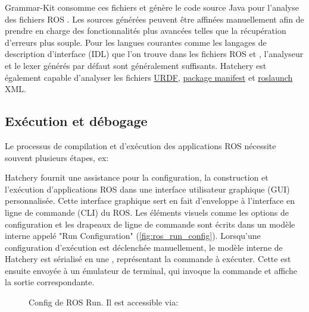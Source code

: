 Grammar-Kit consomme ces fichiers et génère le code source Java pour l'analyse des fichiers ROS \href{https://wiki.ros.org/msg}{}. Les sources générées peuvent être affinées manuellement afin de prendre en charge des fonctionnalités plus avancées telles que la récupération d'erreurs plus souple. Pour les langues courantes comme les langages de description d'interface (IDL) que l'on trouve dans les fichiers ROS \href{https://wiki.ros.org/msg}{} et \href{https://wiki.ros.org/srv}{}, l'analyseur et le lexer générés par défaut sont généralement suffisants. Hatchery est également capable d'analyser les fichiers \href{https://wiki.ros.org/urdf}{URDF}, \href{https://wiki.ros.org/Manifest}{package manifest} et \href{https://wiki.ros.org/roslaunch/XML}{roslaunch} XML.

\subsection{Exécution et débogage}

Le processus de compilation et d'exécution des applications ROS nécessite souvent plusieurs étapes, ex:
%
%
Hatchery fournit une assistance pour la configuration, la construction et l'exécution d'applications ROS dans une interface utilisateur graphique (GUI) personnalisée. Cette interface graphique sert en fait d'enveloppe à l'interface en ligne de commande (CLI) du ROS. Les éléments visuels comme les options de configuration et les drapeaux de ligne de commande sont écrits dans un modèle interne appelé "Run Configuration" (\autoref{fig:ros_run_config}). Lorsqu'une configuration d'exécution est déclenchée manuellement, le modèle interne de Hatchery est sérialisé en une , représentant la commande à exécuter. Cette  est ensuite envoyée à un émulateur de terminal, qui invoque la commande et affiche la sortie correspondante.

\begin{figure}
\centering
{}
\caption{Config de ROS Run. Il est accessible via: }
\label{fig:ros_run_config}
\end{figure}

